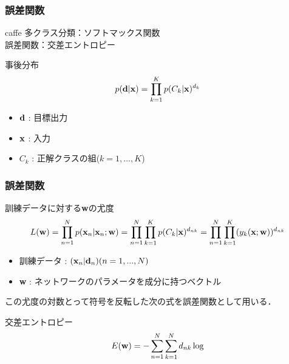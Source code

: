 \documentclass[dvipdfmx,11pt,notheorems]{beamer}
\theoremstyle{definition}
\begin{document}
\begin{frame}[fragile]\frametitle{誤差関数}
 \begin{block}{caffe}
 多クラス分類：ソフトマックス関数\\
 誤差関数：交差エントロピー
 \end{block}

 \begin{exampleblock}{事後分布}
  \begin{equation}
   p({\bf d}|{\bf x}) = \prod_{k=1}^{K}p(C_k|{\bf x})^{d_k}
  \end{equation}
 \end{exampleblock}

 \begin{itemize}
	\item ${\bf d}$ : 目標出力
	\item ${\bf x}$ : 入力
	\item $C_k$ : 正解クラスの組($k=1,...,K$)
 \end{itemize}

\end{frame}

\begin{frame}[fragile]\frametitle{誤差関数}

 \begin{exampleblock}{訓練データに対する{\bf w}の尤度}
  \begin{equation}
    L({\bf w})=\prod_{n=1}^{N}p({\bf x}_n|{\bf x}_n;{\bf
	w})=\prod_{n=1}^{N}\prod_{k=1}^{K}p(C_k|{\bf
	x})^{d_{nk}}=\prod_{n=1}^{N}\prod_{k=1}^{K}(y_k({\bf x};{\bf w}))^{d_{nk}}
  \end{equation}
 \end{exampleblock}

 \begin{itemize}
	\item 訓練データ : ${({\bf x}_n|{\bf d}_n)}(n=1,...,N)$
	\item {\bf w} : ネットワークのパラメータを成分に持つベクトル
 \end{itemize}

この尤度の対数とって符号を反転した次の式を誤差関数として用いる．

 \begin{exampleblock}{交差エントロピー}
  \begin{equation}
   E({\bf w})=-\sum^{N}_{n=1}\sum^{N}_{k=1}d_{nk}\log
  \end{equation}
 \end{exampleblock}

\end{frame}
\end{document}
